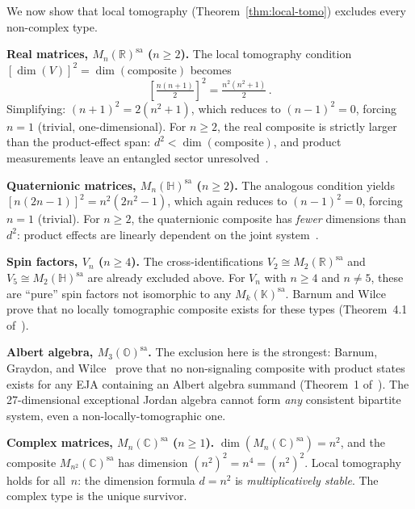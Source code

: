 We now show that local tomography (Theorem~\ref{thm:local-tomo})
excludes every non-complex type.

\medskip
\noindent
\textbf{Real matrices, $M_n(\mathbb{R})^{\mathrm{sa}}$ ($n \ge 2$).}
The local tomography condition $[\dim(V)]^2 = \dim(\text{composite})$
becomes
\[
  \left[\tfrac{n(n+1)}{2}\right]^2
  = \tfrac{n^2(n^2+1)}{2}\,.
\]
Simplifying: $(n+1)^2 = 2(n^2+1)$, which reduces to
$(n-1)^2 = 0$, forcing $n = 1$ (trivial,
one-dimensional). For $n \ge 2$, the real composite is strictly larger
than the product-effect span: $d^2 < \dim(\text{composite})$, and product
measurements leave an entangled sector
unresolved~\cite{BarnumWilce2014}.

\medskip
\noindent
\textbf{Quaternionic matrices,
$M_n(\mathbb{H})^{\mathrm{sa}}$ ($n \ge 2$).}
The analogous condition yields
$[n(2n-1)]^2 = n^2(2n^2-1)$, which again reduces to
$(n-1)^2 = 0$, forcing $n = 1$ (trivial). For $n \ge 2$,
the quaternionic composite has \emph{fewer} dimensions than $d^2$:
product effects are linearly dependent on the joint
system~\cite{BarnumWilce2014}.

\medskip
\noindent
\textbf{Spin factors, $V_n$ ($n \ge 4$).}
The cross-identifications $V_2\cong M_2(\mathbb{R})^{\mathrm{sa}}$ and
$V_5\cong M_2(\mathbb{H})^{\mathrm{sa}}$ are already excluded above.
For $V_n$ with $n\ge 4$ and $n\ne 5$, these are ``pure'' spin factors not
isomorphic to any $M_k(\mathbb{K})^{\mathrm{sa}}$.
Barnum and Wilce~\cite{BarnumWilce2014} prove that no locally tomographic
composite exists for these types (Theorem~4.1 of~\cite{BarnumWilce2014}).

\medskip
\noindent
\textbf{Albert algebra, $M_3(\mathbb{O})^{\mathrm{sa}}$.}
The exclusion here is the strongest: Barnum, Graydon, and
Wilce~\cite{BarnumUdudeckVdW2020} prove that no non-signaling composite with product
states exists for any EJA containing an Albert algebra summand
(Theorem~1 of~\cite{BarnumUdudeckVdW2020}). The 27-dimensional exceptional Jordan
algebra cannot form \emph{any} consistent bipartite system, even a
non-locally-tomographic one.

\medskip
\noindent
\textbf{Complex matrices, $M_n(\mathbb{C})^{\mathrm{sa}}$ ($n \ge 1$).}
$\dim(M_n(\mathbb{C})^{\mathrm{sa}}) = n^2$, and the composite
$M_{n^2}(\mathbb{C})^{\mathrm{sa}}$ has dimension $(n^2)^2 = n^4 =
(n^2)^2$. Local tomography holds for all~$n$: the dimension formula
$d = n^2$ is \emph{multiplicatively stable}. The complex type is the
unique survivor.

